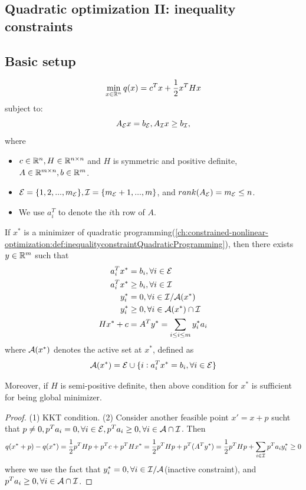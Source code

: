 \begin{refsection}
\section{Quadratic optimization II: inequality constraints}
\subsection{Basic setup}
\begin{definition}\label{ch:constrained-nonlinear-optimization:def:inequalityconstraintQuadraticProgramming}
$$\min_{x\in\mathbb{R}^n} q(x) = c^Tx + \frac{1}{2}x^THx$$
subject to:
$$A_{\mathcal{E}} x = b_{\mathcal{E}}, A_{\mathcal{I}} x \geq b_{\mathcal{I}},$$
where
\begin{itemize}
	\item $c\in \mathbb{R}^n, H\in \mathbb{R}^{n\times n}$ and $H$ is symmetric and positive definite, $A\in \mathbb{R}^{m\times n}, b\in \mathbb{R}^m$.
	\item $\mathcal{E} = \{1,2,...,m_{\mathcal{E}}\}, \mathcal{I} =\{m_{\mathcal{E}}+1,...,m\}$, and $rank(A_{\mathcal{E}}) = m_{\mathcal{E}} \leq n$.
	\item We use $a_i^T$ to denote the $i$th row of $A$.  
\end{itemize}
\end{definition}


\begin{lemma}
If $x^*$ is a minimizer of quadratic programming(\autoref{ch:constrained-nonlinear-optimization:def:inequalityconstraintQuadraticProgramming}), then there exists $y\in \mathbb{R}^m$ such that
\begin{align*}
a_i^T x^* &= b_i, \forall i\in \mathcal{E}\\
a_i^T x^* &\geq b_i, \forall i \in \mathcal{I}\\
y_i^* &= 0, \forall i\in \mathcal{I} / \mathcal{A}(x^*)\\
y_i^* &\geq 0, \forall i \in \mathcal{A}(x^*)\cap \mathcal{I}\\
Hx^* + c & = A^Ty^* = \sum_{i\leq i \leq m} y_i^* a_i
\end{align*}
where $\mathcal{A}(x^*)$ denotes the active set at $x^*$, defined as
$$\mathcal{A}(x^*) = \mathcal{E} \cup \{i:a_i^Tx^* = b_i, \forall i \in \mathcal{E} \}$$

Moreover, if $H$ is semi-positive definite, then above condition for $x^*$ is sufficient for being global minimizer. 
\end{lemma}
\begin{proof}
(1) KKT condition. (2) Consider another feasible point $x' = x+p$ sucht that $p\neq 0, p^T a_i = 0,\forall i\in \mathcal{E}, p^Ta_i \geq 0, \forall i\in \mathcal{A}\cap \mathcal{I}$.
Then
$$q(x^*+p) - q(x^*) = \frac{1}{2}p^THp + p^Tc + p^THx^* =\frac{1}{2}p^THp + p^T(A^Ty^*) =\frac{1}{2}p^THp + \sum_{i\in\mathcal{I}} p^Ta_iy^*_i \geq 0$$
where we use the fact that $y_i^* = 0, \forall i\in \mathcal{I} / \mathcal{A}$(inactive constraint), and $ p^Ta_i \geq 0, \forall i\in \mathcal{A}\cap \mathcal{I}$.
\end{proof}


\end{refsection}

